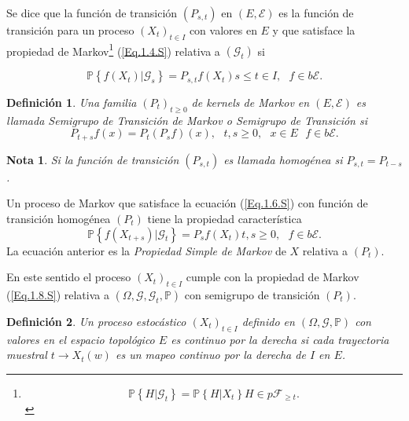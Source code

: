 \documentclass{article}
\newtheorem{Def}{Definición}
\newtheorem{Note}{Nota}
\newcommand{\prob}{\mathbb{P}}
\newcommand{\ER}{\left(E,\mathcal{E}\right)}
\newcommand{\KM}{\left(P_{s,t}\right)}
\newcommand{\PE}{\left(X_{t}\right)_{t\in I}}
\begin{document}
Se dice que la funci\'on de transici\'on $\KM$ en $\ER$ es la
funci\'on de transici\'on para un proceso $\PE$  con valores en
$E$ y que satisface la propiedad de
Markov\footnote{\begin{equation}\label{Eq.1.4.S}
\prob\left\{H|\mathcal{G}_{t}\right\}=\prob\left\{H|X_{t}\right\}\textrm{
}H\in p\mathcal{F}_{\geq t}.
\end{equation}} (\ref{Eq.1.4.S}) relativa a $\left(\mathcal{G}_{t}\right)$ si

\begin{equation}\label{Eq.1.6.S}
\prob\left\{f\left(X_{t}\right)|\mathcal{G}_{s}\right\}=P_{s,t}f\left(X_{t}\right)\textrm{
}s\leq t\in I,\textrm{ }f\in b\mathcal{E}.
\end{equation}

\begin{Def}
Una familia $\left(P_{t}\right)_{t\geq0}$ de kernels de Markov en
$\ER$ es llamada {\em Semigrupo de Transici\'on de Markov} o {\em
Semigrupo de Transici\'on} si
\[P_{t+s}f\left(x\right)=P_{t}\left(P_{s}f\right)\left(x\right),\textrm{ }t,s\geq0,\textrm{ }x\in E\textrm{ }f\in b\mathcal{E}.\]
\end{Def}
\begin{Note}
Si la funci\'on de transici\'on $\KM$ es llamada homog\'enea si
$P_{s,t}=P_{t-s}$.
\end{Note}

Un proceso de Markov que satisface la ecuaci\'on (\ref{Eq.1.6.S})
con funci\'on de transici\'on homog\'enea $\left(P_{t}\right)$
tiene la propiedad caracter\'istica
\begin{equation}\label{Eq.1.8.S}
\prob\left\{f\left(X_{t+s}\right)|\mathcal{G}_{t}\right\}=P_{s}f\left(X_{t}\right)\textrm{
}t,s\geq0,\textrm{ }f\in b\mathcal{E}.
\end{equation}
La ecuaci\'on anterior es la {\em Propiedad Simple de Markov} de
$X$ relativa a $\left(P_{t}\right)$.

En este sentido el proceso $\PE$ cumple con la propiedad de Markov
(\ref{Eq.1.8.S}) relativa a
$\left(\Omega,\mathcal{G},\mathcal{G}_{t},\prob\right)$ con
semigrupo de transici\'on $\left(P_{t}\right)$.

\begin{Def}
Un proceso estoc\'astico $\PE$ definido en
$\left(\Omega,\mathcal{G},\prob\right)$ con valores en el espacio
topol\'ogico $E$ es continuo por la derecha si cada trayectoria
muestral $t\rightarrow X_{t}\left(w\right)$ es un mapeo continuo
por la derecha de $I$ en $E$.
\end{Def}
\end{document}
